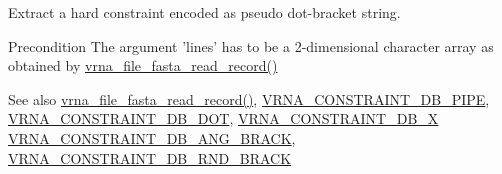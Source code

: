 Extract a hard constraint encoded as pseudo dot-\/bracket string. 

\begin{DoxyPrecond}{Precondition}
The argument 'lines' has to be a 2-\/dimensional character array as obtained by \hyperlink{group__file__utils_ga8cfb7e271efc9e1f34640acb85475639}{vrna\+\_\+file\+\_\+fasta\+\_\+read\+\_\+record()} 
\end{DoxyPrecond}
\begin{DoxySeeAlso}{See also}
\hyperlink{group__file__utils_ga8cfb7e271efc9e1f34640acb85475639}{vrna\+\_\+file\+\_\+fasta\+\_\+read\+\_\+record()}, \hyperlink{group__constraints_ga13053547a2de5532b64b64d35e097ae1}{V\+R\+N\+A\+\_\+\+C\+O\+N\+S\+T\+R\+A\+I\+N\+T\+\_\+\+D\+B\+\_\+\+P\+I\+P\+E}, \hyperlink{group__constraints_ga369bea82eae75fbe626f409fa425747e}{V\+R\+N\+A\+\_\+\+C\+O\+N\+S\+T\+R\+A\+I\+N\+T\+\_\+\+D\+B\+\_\+\+D\+O\+T}, \hyperlink{group__constraints_ga7283bbe0f8954f7b030ecc3f2d1932b2}{V\+R\+N\+A\+\_\+\+C\+O\+N\+S\+T\+R\+A\+I\+N\+T\+\_\+\+D\+B\+\_\+\+X} \hyperlink{group__constraints_gad54c1315a47d55653dcaa5de6e544b77}{V\+R\+N\+A\+\_\+\+C\+O\+N\+S\+T\+R\+A\+I\+N\+T\+\_\+\+D\+B\+\_\+\+A\+N\+G\+\_\+\+B\+R\+A\+C\+K}, \hyperlink{group__constraints_gac17b034852c914bc5879954c65d7e74b}{V\+R\+N\+A\+\_\+\+C\+O\+N\+S\+T\+R\+A\+I\+N\+T\+\_\+\+D\+B\+\_\+\+R\+N\+D\+\_\+\+B\+R\+A\+C\+K}
\end{DoxySeeAlso}

